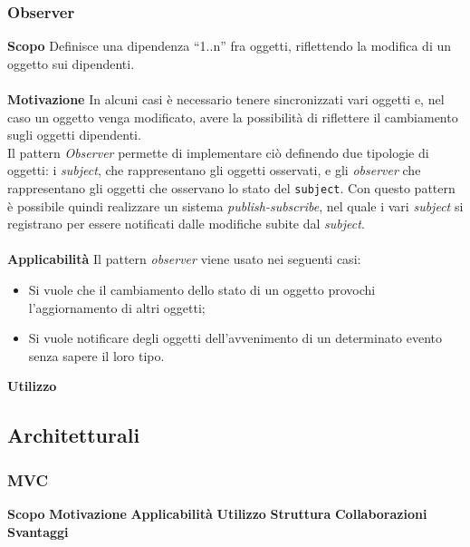 \subsubsection{Observer}
\textbf{Scopo}	Definisce una dipendenza “1..n” fra oggetti, riflettendo la modifica di un oggetto sui dipendenti.
\\\\
\textbf{Motivazione}	In alcuni casi è necessario tenere sincronizzati vari oggetti e, nel caso un oggetto venga modificato, avere la possibilità di riflettere il cambiamento sugli oggetti dipendenti. \\ Il pattern \textit{Observer} permette di implementare ciò definendo due tipologie di oggetti: i \textit{subject}, che rappresentano gli oggetti osservati, e gli \textit{observer} che rappresentano gli oggetti che osservano lo stato del \texttt{subject}. Con questo pattern è possibile quindi realizzare un sistema \textit{publish-subscribe}, nel quale i vari \textit{subject} si registrano per essere notificati dalle modifiche subite dal \textit{subject}.
\\\\
\textbf{Applicabilità}	Il pattern \textit{observer} viene usato nei seguenti casi:
	\begin{itemize}
		\item Si vuole che il cambiamento dello stato di un oggetto provochi l'aggiornamento di altri oggetti;
		\item Si vuole notificare degli oggetti dell'avvenimento di un determinato evento senza sapere il loro tipo.
	\end{itemize}

\textbf{Utilizzo}

\subsection{Architetturali}
\subsubsection{MVC}
\textbf{Scopo}
\textbf{Motivazione}
\textbf{Applicabilità}
\textbf{Utilizzo}
\textbf{Struttura}
\textbf{Collaborazioni}
\textbf{Svantaggi}
